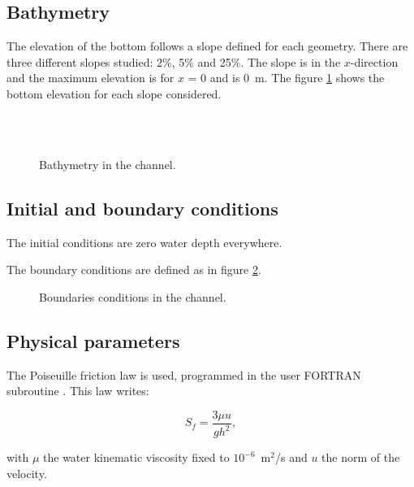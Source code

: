 \subsection{Bathymetry}
The elevation of the bottom follows a slope defined for each geometry.
There are three different slopes studied: 2\%, 5\% and 25\%.
The slope is in the $x$-direction and the maximum elevation is for $x$ = 0 and
is 0~m.
The figure \ref{t2d:rain_runoff:fig:bathy} shows the bottom elevation for each
slope considered.

\begin{figure}[H]
 \centering
 \\
 \\
 \caption{Bathymetry in the channel.}
 \label{t2d:rain_runoff:fig:bathy}
\end{figure}

\subsection{Initial and boundary conditions}

The initial conditions are zero water depth everywhere.

The boundary conditions are defined as in figure \ref{t2d:rain_runoff:fig:bcd}.

\begin{figure}[H]
 \centering
 \caption{Boundaries conditions in the channel.}
 \label{t2d:rain_runoff:fig:bcd}
\end{figure}

\subsection{Physical parameters}
\label{t2d:rain_runoff:physical_parameters}

The Poiseuille friction law is used, programmed in the user FORTRAN subroutine
. This law writes:

\begin{equation}
 S_f=\frac{3\mu u}{gh^2},
\end{equation}

with $\mu$ the water kinematic viscosity fixed to $10^{-6}$~m$^2$/s
and $u$ the norm of the velocity.

